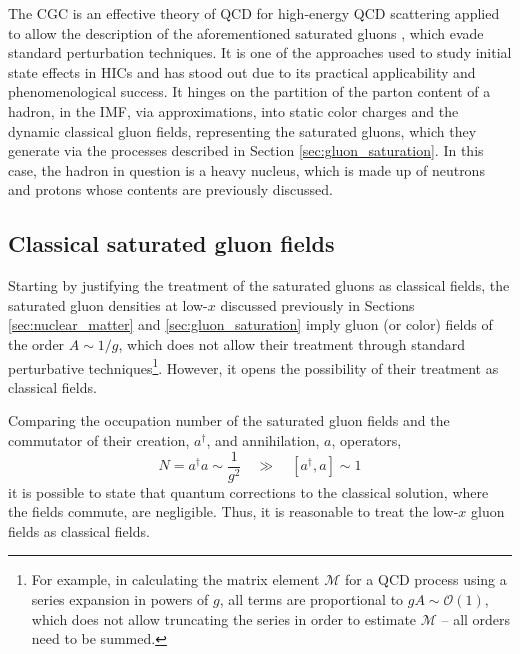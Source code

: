 The \gls{CGC} is an effective theory of \gls{QCD} for high-energy \gls{QCD} scattering applied to allow the description of the aforementioned saturated gluons \cite{Gelis_2010}, which evade standard perturbation techniques. It is one of the approaches used to study initial state effects in \glspl{HIC} and has stood out due to its practical applicability and phenomenological success.\cite{Albacete_2014} It hinges on the partition of the parton content of a hadron, in the \gls{IMF},
 via approximations, into static color charges and the dynamic classical gluon fields, representing the saturated gluons, which they generate via the processes described in Section \ref{sec:gluon_saturation}.\cite{Gelis_2010} In this case, the hadron in question is a heavy nucleus, which is made up of neutrons and protons whose contents are previously discussed.


\subsection{Classical saturated gluon fields}

Starting by justifying the treatment of the saturated gluons as classical fields, the saturated gluon densities at low-$x$ discussed previously in Sections \ref{sec:nuclear_matter} and \ref{sec:gluon_saturation} imply gluon (or color) fields of the order $A \sim 1/g$, which does not allow their treatment through standard perturbative techniques\footnote{For example, in calculating the matrix element $\mathcal{M}$ for a \gls{QCD} process using a series expansion in powers of $g$, all terms are proportional to $gA \sim \mathcal{O}(1)$, which does not allow truncating the series in order to estimate $\mathcal{M}$ -- all orders need to be summed.}.\cite{Albacete_2014} However, it opens the possibility of their treatment as classical fields. 

Comparing the occupation number of the saturated gluon fields and the commutator of their creation, $a^\dagger$, and annihilation, $a$, operators, \citep{Albacete_2014}
\begin{equation}
	N = a^\dagger a \sim \frac{1}{g^2} \quad \gg \quad [a^\dagger, a] \sim 1
\end{equation}
it is possible to state that quantum corrections to the classical solution, where the fields commute, are negligible. Thus, it is reasonable to treat the low-$x$ gluon fields as classical fields.

